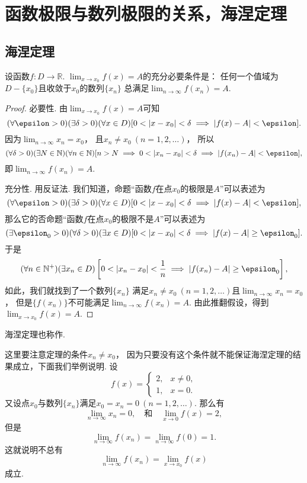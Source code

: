 \section{函数极限与数列极限的关系，海涅定理}
\subsection{海涅定理}
\begin{theorem}[海涅定理]\label{theorem:极限.海涅定理}
设函数\(f\colon D\to\mathbb{R}\).
\(\lim_{x \to x_0} f(x) = A\)的充分必要条件是：
任何一个值域为\(D-\{x_0\}\)且收敛于\(x_0\)的数列\(\{x_n\}\)
总满足\(\lim_{n\to\infty} f(x_n) = A\).
\begin{proof}
必要性.
由\(\lim_{x \to x_0} f(x) = A\)可知\[
	(\forall\epsilon>0)
	(\exists\delta>0)
	(\forall x\in D)
	[
		0<\abs{x-x_0}<\delta
		\implies
		\abs{f(x)-A}<\epsilon
	].
\]
因为\(\lim_{n\to\infty} x_n = x_0\)，
且\(x_n \neq x_0\ (n=1,2,\dotsc)\)，
所以\[
	(\forall\delta>0)
	(\exists N\in\mathbb{N})
	(\forall n\in\mathbb{N})
	[
		n>N
		\implies
		0<\abs{x_n-x_0}<\delta
		\implies
		\abs{f(x_n)-A}<\epsilon
	],
\]
即\(\lim_{n\to\infty} f(x_n) = A\).

充分性.
用反证法.
我们知道，命题“函数\(f\)在点\(x_0\)的极限是\(A\)”可以表述为\[
	(\forall\epsilon>0)
	(\exists\delta>0)
	(\forall x\in D)
	[
		0<\abs{x-x_0}<\delta
		\implies
		\abs{f(x)-A}<\epsilon
	],
\]
那么它的否命题“函数\(f\)在点\(x_0\)的极限不是\(A\)”可以表述为\[
	(\exists\epsilon_0>0)
	(\forall\delta>0)
	(\exists x\in D)
	[
		0<\abs{x-x_0}<\delta
		\implies
		\abs{f(x)-A}\geq\epsilon_0
	].
\]
于是\[
	(\forall n\in\mathbb{N}^+)
	(\exists x_n\in D)
	\left[
		0<\abs{x_n-x_0}<\frac1n
		\implies
		\abs{f(x_n)-A}\geq\epsilon_0
	\right],
\]
如此，我们就找到了一个数列\(\{x_n\}\)
满足\(x_n\neq x_0\ (n=1,2,\dotsc)\)且\(\lim_{n\to\infty} x_n = x_0\)，
但是\(\{f(x_n)\}\)不可能满足\(\lim_{n\to\infty} f(x_n) = A\).
由此推翻假设，得到\(\lim_{x\to x_0} f(x) = A\).
\end{proof}
\end{theorem}
海涅定理也称作.

这里要注意定理的条件\(x_n \neq x_0\)，
因为只要没有这个条件就不能保证海涅定理的结果成立，下面我们举例说明.
设\[
	f(x) = \left\{ \begin{array}{cl}
		2, & x\neq0, \\
		1, & x=0.
	\end{array} \right.
\]
又设点\(x_0\)与数列\(\{x_n\}\)满足\(x_0=x_n=0\ (n=1,2,\dotsc)\).
那么有\[
	\lim_{n\to\infty} x_n = 0,
	\quad\text{和}\quad
	\lim_{x\to0} f(x) = 2,
\]
但是\[
	\lim_{n\to\infty} f(x_n) = \lim_{n\to\infty} f(0) = 1.
\]这就说明不总有\[
	\lim_{n\to\infty} f(x_n)
	= \lim_{x \to x_0} f(x)
\]成立.

